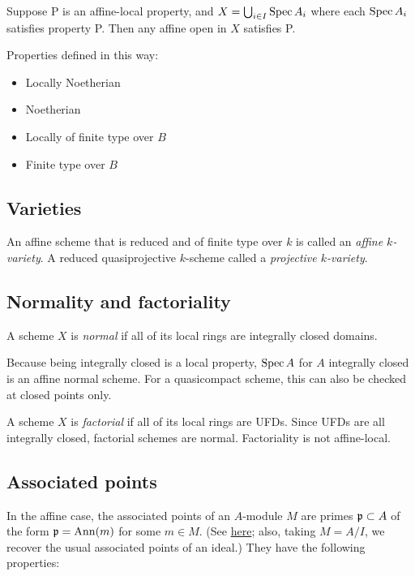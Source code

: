 \documentclass[11pt]{amsart}
\begin{document}
\begin{lem}
\label{ACL}
Suppose P is an affine-local property, and $X = \bigcup_{i\in I} \operatorname{Spec} A_i$ where each $\operatorname{Spec} A_i$ satisfies property P. Then any affine open in $X$ satisfies P.
\end{lem}

Properties defined in this way:
\begin{itemize}
    \item Locally Noetherian
    \item Noetherian
    \item Locally of finite type over $B$
    \item Finite type over $B$
\end{itemize}

\subsection{Varieties}

An affine scheme that is reduced and of finite type over $k$ is called an \emph{affine $k$-variety}. A reduced quasiprojective $k$-scheme called a \emph{projective $k$-variety}.


\subsection{Normality and factoriality}

A scheme $X$ is \emph{normal} if all of its local rings are integrally closed domains.

Because being integrally closed is a local property, $\operatorname{Spec} A$ for $A$ integrally closed is an affine normal scheme. For a quasicompact scheme, this can also be checked at closed points only.

A scheme $X$ is \emph{factorial} if all of its local rings are UFDs. Since UFDs are all integrally closed, factorial schemes are normal. Factoriality is not affine-local.


\subsection{Associated points}

In the affine case, the associated points of an $A$-module $M$ are primes $\mathfrak{p}\subset A$ of the form $\mathfrak{p} = \operatorname{Ann}(m)$ for some $m\in M$. (See \href{https://stacks.math.columbia.edu/tag/00L9}{here}; also, taking $M = A/I$, we recover the usual associated points of an ideal.) They have the following properties:
\end{document}
